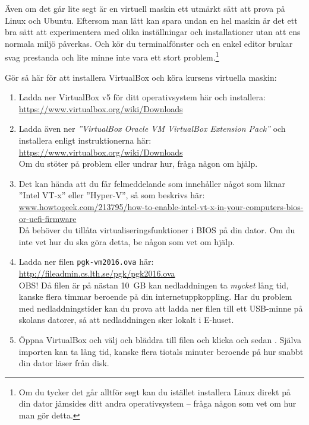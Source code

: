 Även om det går lite segt är en virtuell maskin ett utmärkt sätt att prova på Linux och Ubuntu. Eftersom man lätt kan spara undan en hel maskin är det ett bra sätt att experimentera med olika inställningar och installationer utan att ens normala miljö påverkas. Och kör du terminalfönster och en enkel editor brukar svag prestanda och lite minne inte vara ett stort problem.\footnote{Om du tycker det går alltför segt kan du istället installera Linux direkt på din dator jämsides ditt andra operativsystem -- fråga någon som vet om hur man gör detta.} 

Gör så här för att installera VirtualBox och köra kursens virtuella maskin:
\begin{enumerate}
\item  Ladda ner VirtualBox v5 för ditt operativsystem här och installera: \\ \url{https://www.virtualbox.org/wiki/Downloads}

\item Ladda även ner \textit{''VirtualBox Oracle VM VirtualBox Extension Pack''}  och installera enligt instruktionerna här:\\ \url{https://www.virtualbox.org/wiki/Downloads} \\ Om du stöter på problem eller undrar hur, fråga någon om hjälp.

\item Det kan hända att du får felmeddelande som innehåller något som liknar ''Intel VT-x'' eller ''Hyper-V'', så som beskrivs här:
\\ \href{http://www.howtogeek.com/213795/how-to-enable-intel-vt-x-in-your-computers-bios-or-uefi-firmware/}{www.howtogeek.com/213795/how-to-enable-intel-vt-x-in-your-computers-bios-or-uefi-firmware}\\
Då behöver du tillåta virtualiseringsfunktioner i BIOS på din dator. Om du inte vet hur du ska göra detta, be någon som vet om hjälp.

\item     Ladda ner filen \texttt{pgk-vm2016.ova} här: \\ \url{http://fileadmin.cs.lth.se/pgk/pgk2016.ova} \\ OBS! Då filen är på nästan 10~GB kan nedladdningen ta \textit{mycket} lång tid, kanske flera timmar beroende på din internetuppkoppling. Har du problem med nedladdningstider kan du prova att ladda ner filen till ett USB-minne på skolans datorer, så att nedladdningen sker lokalt i E-huset.

\item     Öppna VirtualBox och välj  och bläddra till filen  och klicka  och sedan . Själva importen kan ta lång tid, kanske flera tiotals minuter beroende på hur snabbt din dator läser från disk.


\end{enumerate}
